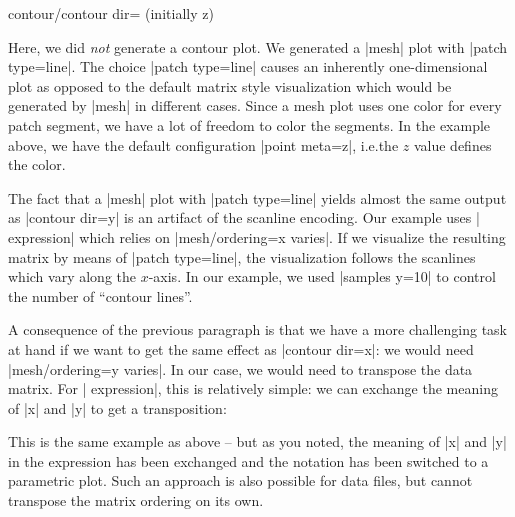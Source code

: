 {{\begin{pgfplotskey}{contour/contour dir= (initially z)}
\pgfplotsexpensiveexample
\begin{codeexample}[]
\end{codeexample}

    Here, we did \emph{not} generate a contour plot. We generated a |mesh| plot
    with |patch type=line|. The choice |patch type=line| causes an inherently
    one-dimensional plot as opposed to the default matrix style visualization
    which would be generated by |mesh| in different
    cases. Since a mesh
    plot uses one color for every patch segment, we have a lot of freedom to
    color the segments. In the example above, we have the default configuration
    |point meta=z|, i.e.\@ the $z$ value defines the color.

    The fact that a |mesh| plot with |patch type=line| yields almost the same
    output as |contour dir=y| is an artifact of the scanline encoding. Our
    example uses | expression| which relies on
    |mesh/ordering=x varies|. If we visualize the resulting matrix by means of
    |patch type=line|, the visualization follows the scanlines which vary along
    the $x$-axis. In our example, we used |samples y=10| to control the number
    of ``contour lines''.

    A consequence of the previous paragraph is that we have a more challenging
    task at hand if we want to get the same effect as |contour dir=x|: we would
    need |mesh/ordering=y varies|. In our case, we would need to transpose the
    data matrix. For | expression|, this is relatively simple: we can
    exchange the meaning of |x| and |y| to get a transposition:

\pgfplotsexpensiveexample
\begin{codeexample}[]
\end{codeexample}
    This is the same example as above -- but as you noted, the meaning of |x|
    and |y| in the expression has been exchanged and the notation has been
    switched to a parametric plot. Such an approach is also possible for data
    files, but \PGFPlots{} cannot transpose the matrix ordering on its own.



\end{pgfplotskey}}}
